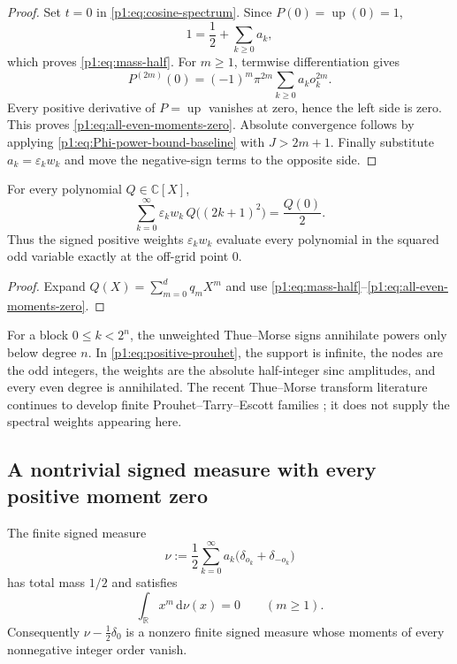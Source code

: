 \documentclass[11pt,oneside]{article}
\theoremstyle{definition}
\theoremstyle{remark}
\newcommand{\R}{\mathbb R}
\newcommand{\C}{\mathbb C}
\newcommand{\Up}{\operatorname{up}}
\newcommand{\dd}{\,\mathrm d}
\newcommand{\eps}{\varepsilon}
\begin{document}
\begin{proof}
Set $t=0$ in \eqref{p1:eq:cosine-spectrum}.  Since $P(0)=\Up(0)=1$,
\[
 1=\frac12+\sum_{k\ge0}a_k,
\]
which proves \eqref{p1:eq:mass-half}.  For $m\ge1$, termwise differentiation gives
\[
 P^{(2m)}(0)=(-1)^m\pi^{2m}
 \sum_{k\ge0}a_ko_k^{2m}.
\]
Every positive derivative of $P=\Up$ vanishes at zero, hence the left side is
zero.  This proves \eqref{p1:eq:all-even-moments-zero}.  Absolute convergence
follows by applying \eqref{p1:eq:Phi-power-bound-baseline} with $J>2m+1$.
Finally substitute $a_k=\eps_kw_k$ and move the negative-sign terms to the
opposite side.
\end{proof}

\begin{corollary}\label{p1:cor:spectral-quadrature}
For every polynomial $Q\in\C[X]$,
\begin{equation}\label{p1:eq:polynomial-quadrature}
 \boxed{
 \sum_{k=0}^{\infty}\eps_kw_k\,Q\bigl((2k+1)^2\bigr)
 =\frac{Q(0)}2.}
\end{equation}
Thus the signed positive weights $\eps_kw_k$ evaluate every polynomial in the
squared odd variable exactly at the off-grid point $0$.
\end{corollary}

\begin{proof}
Expand $Q(X)=\sum_{m=0}^d q_mX^m$ and use
\eqref{p1:eq:mass-half}--\eqref{p1:eq:all-even-moments-zero}.
\end{proof}

\begin{remark}
For a block $0\le k<2^n$, the unweighted Thue--Morse signs annihilate powers
only below degree $n$.  In \eqref{p1:eq:positive-prouhet}, the support is infinite,
the nodes are the odd integers, the weights are the absolute half-integer sinc
amplitudes, and every even degree is annihilated.  The recent Thue--Morse
transform literature continues to develop finite Prouhet--Tarry--Escott
families \cite{p1:cloitre2026}; it does not supply the spectral weights appearing
here.
\end{remark}

\subsection{A nontrivial signed measure with every positive moment zero}

\begin{corollary}\label{p1:cor:moment-null-measure}
The finite signed measure
\begin{equation}\label{p1:eq:nu-measure}
 \nu:=\frac12\sum_{k=0}^{\infty}a_k
 \bigl(\delta_{o_k}+\delta_{-o_k}\bigr)
\end{equation}
has total mass $1/2$ and satisfies
\begin{equation}\label{p1:eq:nu-moments}
 \int_{\R}x^m\dd\nu(x)=0\qquad(m\ge1).
\end{equation}
Consequently $\nu-\tfrac12\delta_0$ is a nonzero finite signed measure whose
moments of every nonnegative integer order vanish.
\end{corollary}
\end{document}

